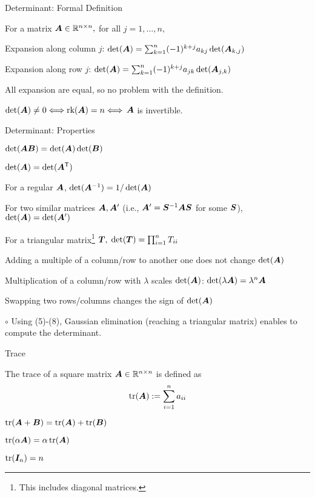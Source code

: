 \documentclass[handout,fleqn,aspectratio=169]{beamer}
\begin{document}
\begin{frame}{Determinant: Formal Definition }

\plitemsep 0.1in

{
For a matrix $\bm{A} \in {\mathbb R}^{n \times n},$ for all $j=1, \ldots, n,$
\bce
\item Expansion along column $j$: 
$
\det(\bm{A}) = \sum_{k=1}^n (-1)^{k+j} a_{kj} \det(\bm{A}_{k,j})
$
\item Expansion along row $j$: 
$
\det(\bm{A})= \sum_{k=1}^n (-1)^{k+j} a_{jk} \det(\bm{A}_{j,k})
$
\ece
}

\bci 
\item All expansion are equal, so no problem with the definition.  
\item \thm $\det(\bm{A}) \neq 0 \Longleftrightarrow \text{rk}(\bm{A}) = n \Longleftrightarrow$ $\bm{A}$ is invertible. 
\eci
\end{frame}

\begin{frame}{Determinant: Properties}

\plitemsep 0.05in

\bce[(1)]
\item $\det(\bm{A}\bm{B}) = \det(\bm{A}) \det(\bm{B})$
\item $\det(\bm{A}) = \det({\bm{A}}^{\mathsf{T}})$
\item For a regular $\bm{A}$, $\det({{\bm{A}}^{-1}}) = 1/\det(\bm{A})$
\item For two similar matrices $\bm{A},\bm{A}'$ (i.e., $\bm{A}' = {{\bm{S}}^{-1}}\bm{A} \bm{S}$ for some $\bm{S}$), $\det(\bm{A}) = \det(\bm{A}')$
\item For a triangular matrix\footnote{This includes diagonal matrices.} $\bm{T},$ $\det(\bm{T}) = \prod_{i=1}^n T_{ii}$
\item Adding a multiple of a column/row to another one does not change $\det(\bm{A})$
\item Multiplication of a column/row with $\lambda$ scales $\det(\bm{A})$: $\det(\lambda \bm{A}) = \lambda^n \bm{A}$
\item Swapping two rows/columns changes the sign of $\det(\bm{A})$
\item[$\circ$] Using (5)-(8), Gaussian elimination (reaching a triangular matrix) enables to compute the determinant. 
\ece
\end{frame}

\begin{frame}{Trace}

\plitemsep 0.1in

\bci
\item {} The trace of a square matrix $\bm{A} \in {\mathbb R}^{n \times n}$ is defined as
$$
\operatorname{tr}(\bm{A}) := \sum_{i=1}^n a_{ii}
$$

\item $\operatorname{tr}(\bm{A} + \bm{B}) = \operatorname{tr}(\bm{A}) + \operatorname{tr}(\bm{B})$
\item $\operatorname{tr}(\alpha \bm{A}) = \alpha \operatorname{tr}(\bm{A})$
\item $\operatorname{tr}(\bm{I}_n) = n$
\eci
\end{frame}
\end{document}
